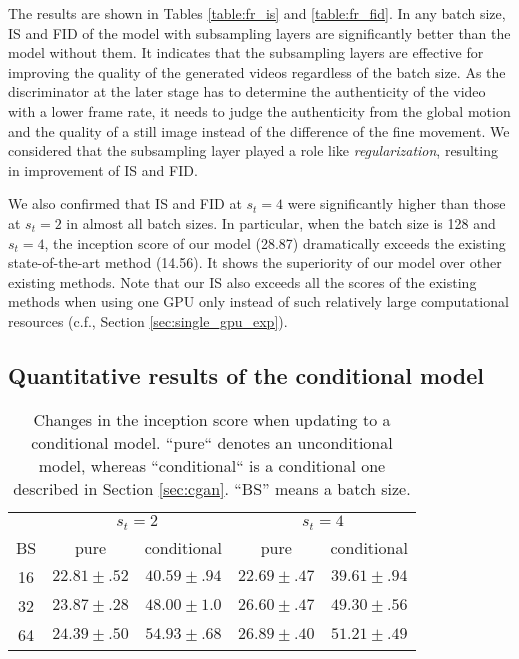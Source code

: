 \documentclass[twocolumn]{svjour3}
\def\Sec#1{Section \ref{sec:#1}}
\begin{document}
The results are shown in Tables \ref{table:fr_is} and \ref{table:fr_fid}.
In any batch size, IS and FID of the model with subsampling layers
are significantly better than the model without them.
It indicates that the subsampling layers are effective for improving the quality of the generated videos
regardless of the batch size.
As the discriminator at the later stage has to determine the authenticity of the video with a lower frame rate,
it needs to judge the authenticity from the global motion and
the quality of a still image instead of the difference of the fine movement.
We considered that the subsampling layer played a role like {\em regularization},
resulting in improvement of IS and FID.









We also confirmed that IS and FID at $s_t=4$ were significantly
higher than those at $s_t=2$ in almost all batch sizes.
In particular, when the batch size is 128 and $s_t=4$,
the inception score of our model (28.87) dramatically exceeds
the existing state-of-the-art method (14.56).
It shows the superiority of our model over other existing methods.
Note that our IS also exceeds all the scores of the existing methods
when using one GPU only instead of
such relatively large computational resources
(c.f., \Sec{single_gpu_exp}).

\subsection{Quantitative results of the conditional model}
\begin{table}
\centering
{\renewcommand{\arraystretch}{1.2}
\begin{tabular}{c|cc|cc}
& \multicolumn{2}{|c|}{$s_t = 2$} & \multicolumn{2}{|c}{$s_t = 4$} \\ \cline{2-5}
BS & pure & conditional & pure & conditional \\ \hline \hline
16 & {$22.81 \pm .52$} & {$40.59 \pm .94$} & ${22.69 \pm .47}$ & {$39.61 \pm .94$} \\
32 & {$23.87 \pm .28$} & {$48.00 \pm 1.0$} & ${26.60 \pm .47}$ & {$49.30 \pm .56$} \\
64 & {$24.39 \pm .50$} & {$54.93 \pm .68$} & ${26.89 \pm .40}$ & {$51.21 \pm .49$} \\ \hline
\end{tabular}
}
\caption{Changes in the inception score when updating to a conditional model. ``pure`` denotes an unconditional model, whereas ``conditional`` is a conditional one described in \Sec{cgan}. ``BS'' means a batch size.}
\label{table:cond_is}
\end{table}
\end{document}
